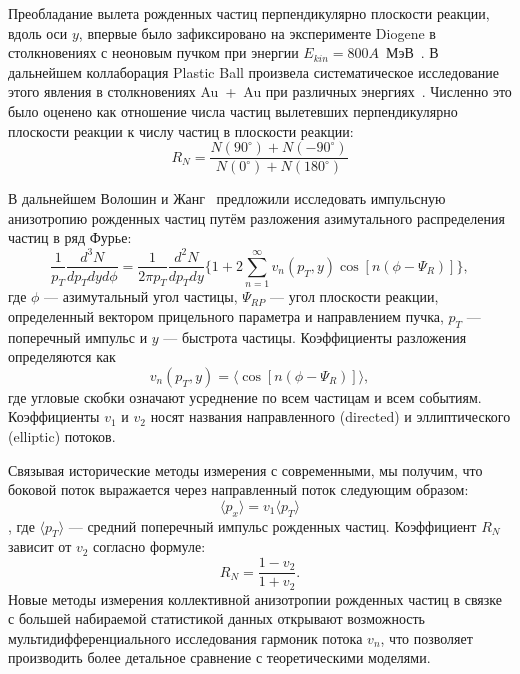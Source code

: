 Преобладание вылета рожденных частиц перпендикулярно плоскости реакции, вдоль оси $y$, впервые было зафиксировано на эксперименте Diogene в столкновениях с неоновым пучком при энергии $E_{kin}=800A$~МэВ~\cite{Demoulins:1990ac}.
В дальнейшем коллаборация Plastic Ball произвела систематическое исследование этого явления в столкновениях Au~+~Au при различных энергиях~\cite{Gustafsson:1984qh, Gutbrod:1988hh}.
Численно это было оценено как отношение числа частиц вылетевших перпендикулярно плоскости реакции к числу частиц в плоскости реакции:
\begin{equation}
    R_N = \frac{ N(90^{\circ} ) + N(-90^{\circ}) }{ N(0^{\circ}) + N(180^{\circ}) }
\end{equation}

В дальнейшем Волошин и Жанг~\cite{Voloshin:1994mz, Poskanzer:1998yz} предложили исследовать импульсную анизотропию рожденных частиц путём разложения азимутального распределения частиц в ряд Фурье:
%
\begin{equation}
    \frac{1}{p_T}\frac{d^3 N}{dp_T dy d\phi} = 
    \frac{ 1 }{2\pi p_T} \frac{ d^2 N }{dp_T dy} \{
    1 + 2\sum_{n=1}^{\infty} v_n(p_T,y) \cos[ n ( \phi - \Psi_R ) ]
    \},
\end{equation}
%
где $\phi$ --- азимутальный угол частицы, $\Psi_{RP}$ --- угол плоскости реакции, определенный вектором прицельного параметра и направлением пучка, $p_T$ --- поперечный импульс и $y$ --- быстрота частицы.
Коэффициенты разложения определяются как 
%
\begin{equation}
    v_n(p_T,y) = \langle  \cos[ n ( \phi - \Psi_R ) ] \rangle,
\end{equation}
%
где угловые скобки означают усреднение по всем частицам и всем событиям. 
Коэффициенты $v_1$ и $v_2$ носят названия направленного (directed) и эллиптического (elliptic) потоков.

Связывая исторические методы измерения с современными, мы получим, что боковой поток выражается через направленный поток следующим образом:
\begin{equation}
    \langle p_x \rangle = v_1 \langle p_T \rangle 
\end{equation},
где $\langle p_T \rangle $ --- средний поперечный импульс рожденных частиц.
Коэффициент $R_N$ зависит от $v_2$ согласно формуле:
\begin{equation}
    R_N = \frac{1 - v_2}{1 + v_2}.
\end{equation}
Новые методы измерения коллективной анизотропии рожденных частиц в связке с большей набираемой статистикой данных открывают возможность мультидифференциального исследования гармоник потока $v_n$, что позволяет производить более детальное сравнение с теоретическими моделями.

